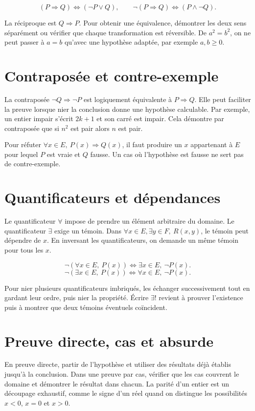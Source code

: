 \documentclass[11pt,a4paper]{article}
\begin{document}
\[ (P\Rightarrow Q)\iff(\neg P\lor Q),\qquad
\neg(P\Rightarrow Q)\iff(P\land\neg Q). \]

La réciproque est $Q\Rightarrow P$. Pour obtenir une équivalence, démontrer les deux sens séparément ou vérifier que chaque transformation est réversible. De $a^2=b^2$, on ne peut passer à $a=b$ qu’avec une hypothèse adaptée, par exemple $a,b\ge0$.

\section*{Contraposée et contre-exemple}
La contraposée $\neg Q\Rightarrow\neg P$ est logiquement équivalente à $P\Rightarrow Q$. Elle peut faciliter la preuve lorsque nier la conclusion donne une hypothèse calculable. Par exemple, un entier impair s’écrit $2k+1$ et son carré est impair. Cela démontre par contraposée que si $n^2$ est pair alors $n$ est pair.

Pour réfuter $\forall x\in E,\ P(x)\Rightarrow Q(x)$, il faut produire un $x$ appartenant à $E$ pour lequel $P$ est vraie et $Q$ fausse. Un cas où l’hypothèse est fausse ne sert pas de contre-exemple.

\section*{Quantificateurs et dépendances}
Le quantificateur $\forall$ impose de prendre un élément arbitraire du domaine. Le quantificateur $\exists$ exige un témoin. Dans $\forall x\in E,\exists y\in F,\ R(x,y)$, le témoin peut dépendre de $x$. En inversant les quantificateurs, on demande un même témoin pour tous les $x$.

\[ \neg(\forall x\in E,\ P(x))\iff\exists x\in E,\ \neg P(x). \]
\[ \neg(\exists x\in E,\ P(x))\iff\forall x\in E,\ \neg P(x). \]

Pour nier plusieurs quantificateurs imbriqués, les échanger successivement tout en gardant leur ordre, puis nier la propriété. Écrire $\exists!$ revient à prouver l’existence puis à montrer que deux témoins éventuels coïncident.

\section*{Preuve directe, cas et absurde}
En preuve directe, partir de l’hypothèse et utiliser des résultats déjà établis jusqu’à la conclusion. Dans une preuve par cas, vérifier que les cas couvrent le domaine et démontrer le résultat dans chacun. La parité d’un entier est un découpage exhaustif, comme le signe d’un réel quand on distingue les possibilités $x<0$, $x=0$ et $x>0$.
\end{document}
